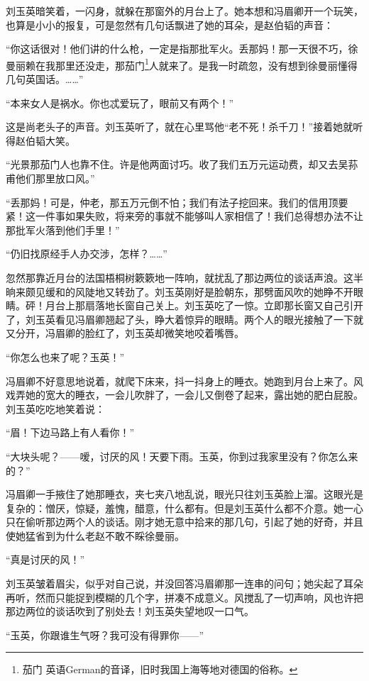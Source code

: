 \par 刘玉英暗笑着，一闪身，就躲在那窗外的月台上了。她本想和冯眉卿开一个玩笑，也算是小小的报复，可是忽然有几句话飘进了她的耳朵，是赵伯韬的声音：
\par “你这话很对！他们讲的什么枪，一定是指那批军火。丢那妈！那一天很不巧，徐曼丽赖在我那里还没走，那茄门\footnote{茄门 英语German的音译，旧时我国上海等地对德国的俗称。}人就来了。是我一时疏忽，没有想到徐曼丽懂得几句英国话。……”
\par “本来女人是祸水。你也忒爱玩了，眼前又有两个！”
\par 这是尚老头子的声音。刘玉英听了，就在心里骂他“老不死！杀千刀！”接着她就听得赵伯韬大笑。
\par “光景那茄门人也靠不住。许是他两面讨巧。收了我们五万元运动费，却又去吴荪甫他们那里放口风。”
\par “丢那妈！可是，仲老，那五万元倒不怕；我们有法子挖回来。我们的信用顶要紧！这一件事如果失败，将来旁的事就不能够叫人家相信了！我们总得想办法不让那批军火落到他们手里！”
\par “仍旧找原经手人办交涉，怎样？……”
\par 忽然那靠近月台的法国梧桐树簌簌地一阵响，就扰乱了那边两位的谈话声浪。这半晌来颇见缓和的风陡地又转劲了。刘玉英刚好是脸朝东，那劈面风吹的她睁不开眼睛。砰！月台上那扇落地长窗自己关上。刘玉英吃了一惊。立即那长窗又自己引开了，刘玉英看见冯眉卿翘起了头，睁大着惊异的眼睛。两个人的眼光接触了一下就又分开，冯眉卿的脸红了，刘玉英却微笑地咬着嘴唇。
\par “你怎么也来了呢？玉英！”
\par 冯眉卿不好意思地说着，就爬下床来，抖一抖身上的睡衣。她跑到月台上来了。风戏弄她的宽大的睡衣，一会儿吹胖了，一会儿又倒卷了起来，露出她的肥白屁股。刘玉英吃吃地笑着说：
\par “眉！下边马路上有人看你！”
\par “大块头呢？——嗳，讨厌的风！天要下雨。玉英，你到过我家里没有？你怎么来的？”
\par 冯眉卿一手掖住了她那睡衣，夹七夹八地乱说，眼光只往刘玉英脸上溜。这眼光是复杂的：憎厌，惊疑，羞愧，醋意，什么都有。但是刘玉英什么都不介意。她一心只在偷听那边两个人的谈话。刚才她无意中拾来的那几句，引起了她的好奇，并且使她猛省到为什么老赵不敢不睬徐曼丽。
\par “真是讨厌的风！”
\par 刘玉英皱着眉尖，似乎对自己说，并没回答冯眉卿那一连串的问句；她尖起了耳朵再听，然而只能捉到模糊的几个字，拼凑不成意义。风搅乱了一切声响，风也许把那边两位的谈话吹到了别处去！刘玉英失望地叹一口气。
\par “玉英，你跟谁生气呀？我可没有得罪你——”
